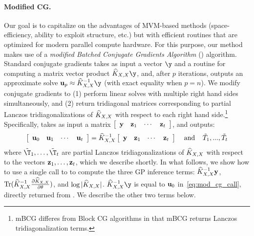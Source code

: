 \paragraph{Modified CG.}
Our goal is to capitalize on the advantages of MVM-based methods (space-efficiency, ability to exploit structure, etc.) but with efficient routines that are optimized for modern parallel compute hardware.
For this purpose, our method makes use of a \emph{modified Batched Conjugate Gradients Algorithm} (\mcgacro{}) algorithm.
Standard conjugate gradients takes as input a vector $\y$ and a routine for computing a matrix vector product $\trainK\y$, and, after $p$ iterations, outputs an approximate solve $\bu_{p} \approx \trainK^{-1}\y$ (with exact equality when $p = n$).
We modify conjugate gradients to (1) perform linear solves with multiple right hand sides simultaneously, and (2) return tridiagonal matrices corresponding to partial Lanczos tridiagonalizations of $\widehat{K}_{X,X}$ with respect to each right hand side.\footnote{
  mBCG differes from Block CG algorithms \cite{o1980block} in that mBCG returns Lanczos tridiagonalization terms.
} Specifically, \mcgacro{} takes as input a matrix $\left[\begin{array}{cccc}\mathbf{y} & \mathbf{z}_{1} & \cdots & \mathbf{z}_{t}\end{array}\right]$, and outputs:
\begin{equation}
  \label{eq:mod_cg_call}
  \left[\begin{array}{cccc}\mathbf{u}_{0} & \mathbf{u}_{1} & \cdots & \mathbf{u}_{t}\end{array}\right] = \widehat{K}_{X,X}^{-1}\left[\begin{array}{cccc}\mathbf{y} & \mathbf{z}_{1} & \cdots & \mathbf{z}_{t}\end{array}\right]\;\;\;\;\textrm{and}\;\;\;\; \tilde{T}_{1},...,\tilde{T}_{t}
\end{equation}
where $\tilde{\T}_{1},\ldots,\tilde{\T}_{t}$ are partial Lanczos tridiagonalizations of $\widehat{K}_{X,X}$ with respect to the vectors $\mathbf{z}_{1},\ldots,\mathbf{z}_{t}$, which we describe shortly.
In what follows, we show how to use a single call to \mcgacro{} to compute the three GP inference terms: $\widehat{K}_{X,X}^{-1} \mathbf{y}$, $\tr{ \trainK^{-1} \frac{\partial \trainK}{\partial \theta} }$, and $\log \vert \widehat{K}_{X,X} \vert$.
%
$\trainK^{-1}\y$ is equal to $\mathbf{u}_{0}$ in~\eqref{eq:mod_cg_call}, directly returned from \mcgacro{}. We describe the other two terms below.

